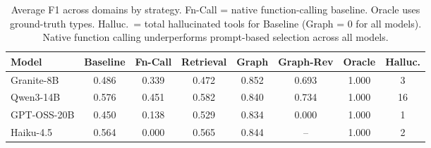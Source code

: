 \begin{table}[t]
\centering
\small
\begin{tabular}{l ccccccc}
\toprule
\textbf{Model} & \textbf{Baseline} & \textbf{Fn-Call} & \textbf{Retrieval} & \textbf{Graph} & \textbf{Graph-Rev} & \textbf{Oracle} & \textbf{Halluc.} \\
\midrule
Granite-8B & 0.486 & 0.339 & 0.472 & 0.852 & 0.693 & 1.000 & 3 \\
Qwen3-14B & 0.576 & 0.451 & 0.582 & 0.840 & 0.734 & 1.000 & 16 \\
GPT-OSS-20B & 0.450 & 0.138 & 0.529 & 0.834 & 0.000 & 1.000 & 1 \\
Haiku-4.5 & 0.564 & 0.000 & 0.565 & 0.844 & -- & 1.000 & 2 \\
\bottomrule
\end{tabular}
\caption{Average F1 across domains by strategy. Fn-Call = native function-calling baseline. Oracle uses ground-truth types. Halluc.\ = total hallucinated tools for Baseline (Graph = 0 for all models). Native function calling underperforms prompt-based selection across all models.}
\label{tab:strategy-comparison}
\end{table}